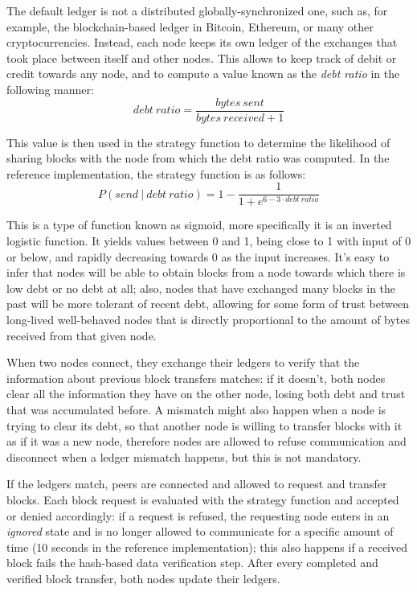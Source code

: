 \documentclass[mscthesis]{usiinfthesis}
\begin{document}
The default ledger is not a distributed globally-synchronized one, such as, for example, the blockchain-based ledger in Bitcoin, Ethereum, or many other cryptocurrencies. Instead, each node keeps its own ledger of the exchanges that took place between itself and other nodes. This allows to keep track of debit or credit towards any node, and to compute a value known as the \textit{debt ratio} in the following manner:
$$ \mathit{debt~ratio} = \frac{\mathit{bytes~sent}}{\mathit{bytes~received} + 1} $$

This value is then used in the strategy function to determine the likelihood of sharing blocks with the node from which the debt ratio was computed. In the reference implementation, the strategy function is as follows:
$$ P\left( \mathit{send}~|~\mathit{debt~ratio} \right) = 1 - \frac{1}{1 + e^{6 - 3\cdot\mathit{debt~ratio}}} $$

This is a type of function known as sigmoid, more specifically it is an inverted logistic function. It yields values between 0 and 1, being close to 1 with input of 0 or below, and rapidly decreasing towards 0 as the input increases. %
It's easy to infer that nodes will be able to obtain blocks from a node towards which there is low debt or no debt at all; also, nodes that have exchanged many blocks in the past will be more tolerant of recent debt, allowing for some form of trust between long-lived well-behaved nodes that is directly proportional to the amount of bytes received from that given node.

When two nodes connect, they exchange their ledgers to verify that the information about previous block transfers matches: if it doesn't, both nodes clear all the information they have on the other node, losing both debt and trust that was accumulated before. A mismatch might also happen when a node is trying to clear its debt, so that another node is willing to transfer blocks with it as if it was a new node, therefore nodes are allowed to refuse communication and disconnect when a ledger mismatch happens, but this is not mandatory.

If the ledgers match, peers are connected and allowed to request and transfer blocks. Each block request is evaluated with the strategy function and accepted or denied accordingly: if a request is refused, the requesting node enters in an \textit{ignored} state and is no longer allowed to communicate for a specific amount of time (10 seconds in the reference implementation); this also happens if a received block fails the hash-based data verification step. After every completed and verified block transfer, both nodes update their ledgers.
\end{document}
